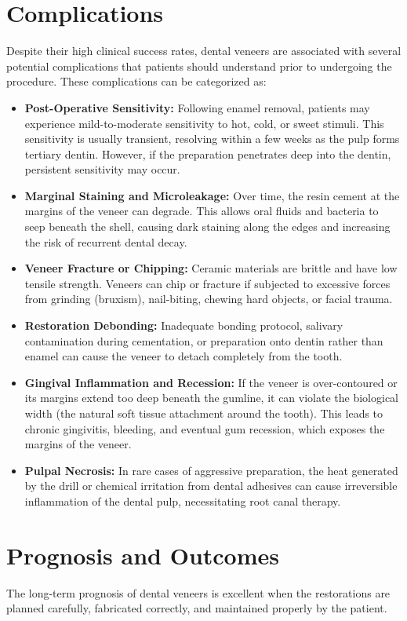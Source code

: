 \section*{Complications}
Despite their high clinical success rates, dental veneers are associated with several potential complications that patients should understand prior to undergoing the procedure. These complications can be categorized as:
\begin{itemize}
    \item \textbf{Post-Operative Sensitivity:} Following enamel removal, patients may experience mild-to-moderate sensitivity to hot, cold, or sweet stimuli. This sensitivity is usually transient, resolving within a few weeks as the pulp forms tertiary dentin. However, if the preparation penetrates deep into the dentin, persistent sensitivity may occur.
    \item \textbf{Marginal Staining and Microleakage:} Over time, the resin cement at the margins of the veneer can degrade. This allows oral fluids and bacteria to seep beneath the shell, causing dark staining along the edges and increasing the risk of recurrent dental decay.
    \item \textbf{Veneer Fracture or Chipping:} Ceramic materials are brittle and have low tensile strength. Veneers can chip or fracture if subjected to excessive forces from grinding (bruxism), nail-biting, chewing hard objects, or facial trauma.
    \item \textbf{Restoration Debonding:} Inadequate bonding protocol, salivary contamination during cementation, or preparation onto dentin rather than enamel can cause the veneer to detach completely from the tooth.
    \item \textbf{Gingival Inflammation and Recession:} If the veneer is over-contoured or its margins extend too deep beneath the gumline, it can violate the biological width (the natural soft tissue attachment around the tooth). This leads to chronic gingivitis, bleeding, and eventual gum recession, which exposes the margins of the veneer.
    \item \textbf{Pulpal Necrosis:} In rare cases of aggressive preparation, the heat generated by the drill or chemical irritation from dental adhesives can cause irreversible inflammation of the dental pulp, necessitating root canal therapy.
\end{itemize}

\section*{Prognosis and Outcomes}
The long-term prognosis of dental veneers is excellent when the restorations are planned carefully, fabricated correctly, and maintained properly by the patient.

